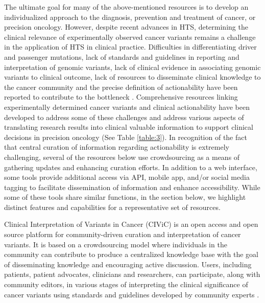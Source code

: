 \documentclass{article}
\begin{document}
The ultimate goal for many of the above-mentioned resources is to
develop an individualized approach to the diagnosis, prevention and
treatment of cancer, or precision oncology. However, despite recent
advances in HTS, determining the clinical relevance of experimentally
observed cancer variants remains a challenge in the application of HTS
in clinical practice. Difficulties in differentiating driver and
passenger mutations, lack of standards and guidelines in reporting and
interpretation of genomic variants, lack of clinical evidence in
associating genomic variants to clinical outcome, lack of resources to
disseminate clinical knowledge to the cancer community and the precise
definition of actionability have been reported to contribute to the
bottleneck
\cite{Li2017-aw,Prawira2017-gv,Uzilov2016-ct,Hedley_Carr2016-ul}. Comprehensive
resources linking experimentally determined cancer variants and
clinical actionability have been developed to address some of these
challenges and address various aspects of translating research results
into clinical valuable information to support clinical decisions in
precision oncology (See Table \ref{table:3}). In recognition of the fact that
central curation of information regarding actionability is extremely
challenging, several of the resources below use crowdsourcing as a
means of gathering updates and enhancing curation efforts. In addition
to a web interface, some tools provide additional access via API,
mobile app, and/or social media tagging to facilitate dissemination of
information and enhance accessibility. While some of these tools share
similar functions, in the section below, we highlight distinct
features and capabilities for a representative set of resources.

Clinical Interpretation of Variants in Cancer (CIViC) is an open
access and open source platform for community-driven curation and
interpretation of cancer variants. It is based on a crowdsourcing
model where individuals in the community can contribute to produce a
centralized knowledge base with the goal of disseminating knowledge
and encouraging active discussion. Users, including patients, patient
advocates, clinicians and researchers, can participate, along with
community editors, in various stages of interpreting the clinical
significance of cancer variants using standards and guidelines
developed by community experts \cite{Li2017-aw,Griffith2016-sy}.
\end{document}

